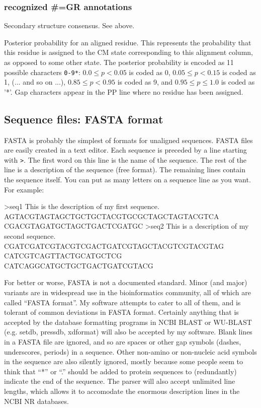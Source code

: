 \subsubsection{recognized \#=GR annotations}
\begin{sreitems}{}
\item [\emprog{SS}]
        Secondary structure consensus. See 
        above.

\item [\emprog{PP}] Posterior probability for an aligned residue. This
  represents the probability that this residue is assigned to the CM
  state corresponding to this alignment column, as opposed to some
  other state. The posterior
  probability is encoded as 11 possible characters \verb+0-9*+: $0.0
  \leq p < 0.05$ is coded as 0, $0.05 \leq p < 0.15$ is coded as 1,
  (... and so on ...), $0.85 \leq p < 0.95$ is coded as 9, and $0.95
  \leq p \leq 1.0$ is coded as '*'. Gap characters appear in the PP
  line where no residue has been assigned.
\end{sreitems}

\subsection{Sequence files: FASTA format}

FASTA is probably the simplest of formats for unaligned sequences.
FASTA files are easily created in a text editor.  Each sequence is
preceded by a line starting with \verb+>+. The first word on this line
is the name of the sequence. The rest of the line is a description of
the sequence (free format). The remaining lines contain the sequence
itself. You can put as many letters on a sequence line as you want.
For example:

\begin{sreoutput}
>seq1 This is the description of my first sequence.
AGTACGTAGTAGCTGCTGCTACGTGCGCTAGCTAGTACGTCA CGACGTAGATGCTAGCTGACTCGATGC
>seq2 This is a description of my second sequence.
CGATCGATCGTACGTCGACTGATCGTAGCTACGTCGTACGTAG CATCGTCAGTTACTGCATGCTCG
CATCAGGCATGCTGCTGACTGATCGTACG
\end{sreoutput}

For better or worse, FASTA is not a documented standard. Minor (and
major) variants are in widespread use in the bioinformatics community,
all of which are called ``FASTA format''. My software attempts to
cater to all of them, and is tolerant of common deviations in FASTA
format. Certainly anything that is accepted by the database formatting
programs in NCBI BLAST or WU-BLAST (e.g. setdb, pressdb, xdformat)
will also be accepted by my software. Blank lines in a FASTA file are
ignored, and so are spaces or other gap symbols (dashes, underscores,
periods) in a sequence. Other non-amino or non-nucleic acid symbols in
the sequence are also silently ignored, mostly because some people
seem to think that ``*'' or ``.'' should be added to protein sequences
to (redundantly) indicate the end of the sequence. The parser will
also accept unlimited line lengths, which allows it to accomodate the
enormous description lines in the NCBI NR databases.


